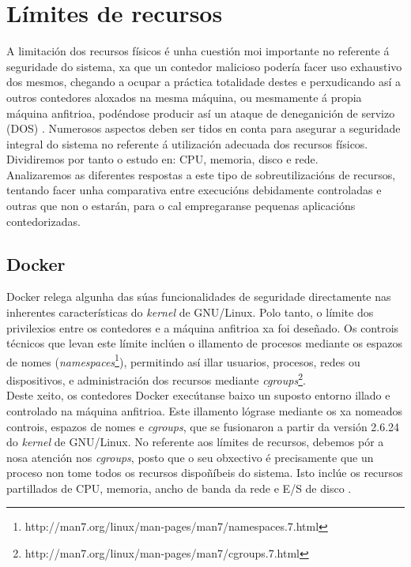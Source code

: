 \section{Límites de recursos}

A limitación dos recursos físicos é unha cuestión moi importante no referente á seguridade do sistema, xa que un contedor malicioso podería facer uso exhaustivo dos mesmos, chegando a ocupar a práctica totalidade destes e perxudicando así a outros contedores aloxados na mesma máquina, ou mesmamente á propia máquina anfitrioa, podéndose producir así un ataque de deneganición de servizo (DOS) \cite{OS-level-security}. Numerosos aspectos deben ser tidos en conta para asegurar a seguridade integral do sistema no referente á utilización adecuada dos recursos físicos. Dividiremos por tanto o estudo en: CPU, memoria, disco e rede.\\

Analizaremos as diferentes respostas a este tipo de sobreutilizacións de recursos, tentando facer unha comparativa entre execucións debidamente controladas e outras que non o estarán, para o cal empregaranse pequenas aplicacións contedorizadas.

\subsection{Docker}

Docker relega algunha das súas funcionalidades de seguridade directamente nas inherentes características do \textit{kernel} de GNU/Linux. Polo tanto, o límite dos privilexios entre os contedores e a máquina anfitrioa xa foi deseñado. Os controis técnicos que levan este límite inclúen o illamento de procesos mediante os espazos de nomes (\textit{namespaces}\footnote{http://man7.org/linux/man-pages/man7/namespaces.7.html}), permitindo así illar usuarios, procesos, redes ou dispositivos, e administración dos recursos mediante \textit{cgroups}\footnote{http://man7.org/linux/man-pages/man7/cgroups.7.html}.\\

Deste xeito, os contedores Docker execútanse baixo un suposto entorno illado e controlado na máquina anfitrioa. Este illamento lógrase mediante os xa nomeados controis, espazos de nomes e \textit{cgroups}, que se fusionaron a partir da versión 2.6.24 do \textit{kernel} de GNU/Linux. No referente aos límites de recursos, debemos pór a nosa atención nos \textit{cgroups}, posto que o seu obxectivo é precisamente que un proceso non tome todos os recursos dispoñíbeis do sistema. Isto inclúe os recursos partillados de CPU, memoria, ancho de banda da rede e E/S de disco \cite{To-Docker-Or-Not-To-Docker}. \\

